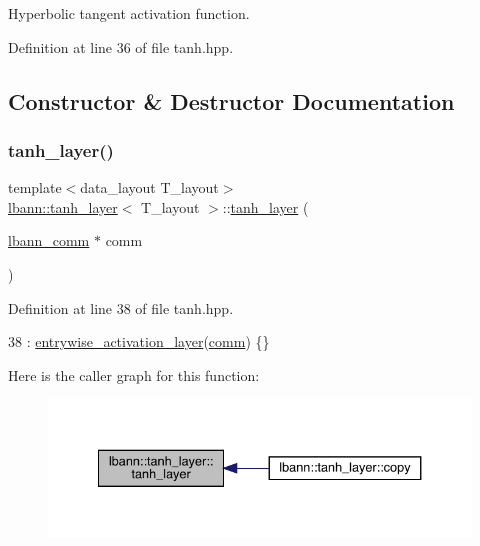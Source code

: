 Hyperbolic tangent activation function. 

Definition at line 36 of file tanh.\+hpp.



\subsection{Constructor \& Destructor Documentation}
\mbox{\label{classlbann_1_1tanh__layer_a24f9a6d92637571583267c5ad7bc9e84}} 
\subsubsection{\texorpdfstring{tanh\+\_\+layer()}{tanh\_layer()}}
{\footnotesize\ttfamily template$<$data\+\_\+layout T\+\_\+layout$>$ \\
\hyperlink{classlbann_1_1tanh__layer}{lbann\+::tanh\+\_\+layer}$<$ T\+\_\+layout $>$\+::\hyperlink{classlbann_1_1tanh__layer}{tanh\+\_\+layer} (\begin{DoxyParamCaption}\item[{\hyperlink{classlbann_1_1lbann__comm}{lbann\+\_\+comm} $\ast$}]{comm }\end{DoxyParamCaption})\hspace{0.3cm}{\ttfamily [inline]}}



Definition at line 38 of file tanh.\+hpp.


\begin{DoxyCode}
38 : \hyperlink{classlbann_1_1entrywise__activation__layer_aada1d9200612dcd13259799ef327c557}{entrywise\_activation\_layer}(\hyperlink{file__io_8cpp_ab048c6f9fcbcfaa57ce68b00263dbebe}{comm}) \{\}
\end{DoxyCode}
Here is the caller graph for this function\+:\nopagebreak
\begin{figure}[H]
\begin{center}
\leavevmode
\includegraphics[width=334pt]{classlbann_1_1tanh__layer_a24f9a6d92637571583267c5ad7bc9e84_icgraph}
\end{center}
\end{figure}


